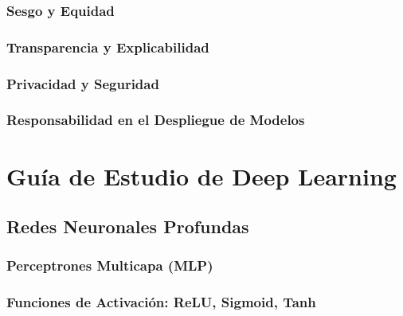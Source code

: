 \documentclass{book}
\begin{document}
\subsection{Sesgo y Equidad}
\newpage
\subsection{Transparencia y Explicabilidad}
\newpage
\subsection{Privacidad y Seguridad}
\newpage
\subsection{Responsabilidad en el Despliegue de Modelos}
\newpage

\chapter{Guía de Estudio de Deep Learning}

\section{Redes Neuronales Profundas}


\subsection{Perceptrones Multicapa (MLP)}
\newpage
\subsection{Funciones de Activación: ReLU, Sigmoid, Tanh}
\newpage
\end{document}
